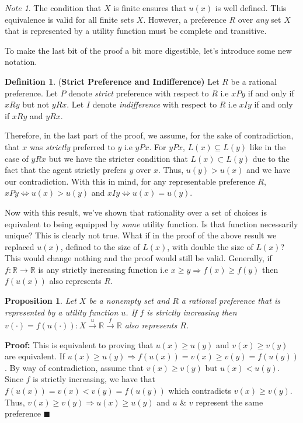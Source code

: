 \documentclass[12pt]{article}
\theoremstyle{plain}
\newtheorem{prop}{Proposition}[section]
\theoremstyle{definition}
\newtheorem{defin}{Definition}[subsection]
\theoremstyle{remark}
\newtheorem*{note}{Note}
\newcommand{\tn}[1]{\textnormal{#1}}
\newcommand{\3}{\vspace*{3mm}}
\newcommand{\name}[1]{\tn{(\textbf{#1)}}}
\newcommand{\RR}{\mathbb{R}}
\newcommand{\RIGHT}{\Longrightarrow}
\newcommand{\IFF}{\Longleftrightarrow}
\newcommand{\QED}{\blacksquare}
\newcommand{\Proof}{\textbf{Proof:} \hspace*{0.25mm}}
\begin{document}
\begin{note}
The condition that $X$ is finite ensures that $u(x)$ is well defined. This equivalence is valid for all finite sets $X$. However, a preference $R$ over \emph{any} set $X$ that is represented by a utility function must be complete and transitive.

\end{note}

To make the last bit of the proof a bit more digestible, let's introduce some new notation.

\begin{defin} \name{Strict Preference and Indifference} Let $R$ be a rational preference. Let $P$ denote \emph{strict} preference with respect to $R$ i.e $x P y$ if and only if $x R y$ but not $y R x$. Let $I$ denote \emph{indifference} with respect to $R$ i.e $x I y$ if and only if $x R y$ and $y R x$.

\end{defin}

Therefore, in the last part of the proof, we assume, for the sake of contradiction, that $x$ was \emph{strictly} preferred to $y$ i.e $y P x$. For $y P x$, $L(x) \subseteq L(y)$ like in the case of $y R x$ but we have the stricter condition that $L(x) \subset L(y)$ due to the fact that the agent strictly prefers $y$ over $x$. Thus, $u(y) > u(x)$ and we have our contradiction. With this in mind, for any representable preference $R$, $x P y \IFF u(x) > u(y)$ and $x I y \IFF u(x) = u(y)$. 


Now with this result, we've shown that rationality over a set of choices is equivalent to being equipped by \emph{some} utility function. Is that function necessarily unique? This is clearly not true. What if in the proof of the above result we replaced $u(x)$, defined to the size of $L(x)$, with double the size of $L(x)$? This would change nothing and the proof would still be valid. Generally, if $f: \RR \to \RR$ is any strictly increasing function i.e $x \geq y \RIGHT f(x) \geq f(y)$ then $f(u(x))$ also represents $R$. 

\begin{prop}
Let $X$ be a nonempty set and $R$ a rational preference that is represented by a utility function $u$. If $f$ is strictly increasing then $v(\cdot) = f(u(\cdot)):X \overset{u}{\to} \RR \overset{f}{\to} \RR$ also represents $R$.
\end{prop}
\Proof This is equivalent to proving that $u(x) \geq u(y)$ and $v(x) \geq v(y)$ are equivalent. If $u(x) \geq u(y) \RIGHT f(u(x)) = v(x) \geq v(y) = f(u(y)) $. By way of contradiction, assume that $v(x) \geq v(y)$ but $u(x) < u(y)$. Since $f$ is strictly increasing, we have that $f(u(x)) = v(x) < v(y) = f(u(y))$ which contradicts $v(x) \geq v(y)$. Thus, $v(x) \geq v(y) \RIGHT u(x) \geq u(y)$ and $u$ \& $v$ represent the same preference $\QED$
\end{document}
